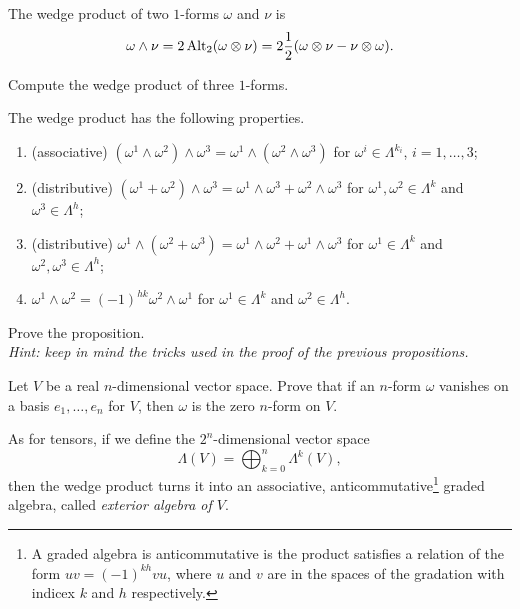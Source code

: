 \begin{example}
  The wedge product of two $1$-forms $\omega$ and $\nu$ is
  \begin{equation}
    \omega\wedge\nu = 2\operatorname{Alt}_2(\omega\otimes\nu) = 2 \frac12 (\omega \otimes \nu - \nu \otimes \omega).
  \end{equation}
\end{example}

\begin{exercise}
  Compute the wedge product of three $1$-forms.
\end{exercise}

\begin{proposition}
  The wedge product has the following properties.
  \begin{enumerate}
    \item (associative) $(\omega^1\wedge\omega^2)\wedge\omega^3 = \omega^1\wedge(\omega^2\wedge\omega^3)$ for $\omega^i\in\Lambda^{k_i}$, $i=1,\ldots, 3$;
    \item (distributive) $(\omega^1+\omega^2)\wedge\omega^3 = \omega^1\wedge\omega^3+\omega^2\wedge\omega^3$ for $\omega^1,\omega^2\in\Lambda^{k}$ and $\omega^3\in\Lambda^h$;
    \item (distributive) $\omega^1\wedge(\omega^2+\omega^3) = \omega^1\wedge\omega^2+\omega^1\wedge\omega^3$ for $\omega^1\in\Lambda^{k}$ and $\omega^2,\omega^3\in\Lambda^h$;
    \item $\omega^1\wedge\omega^2 = {(-1)}^{hk}\omega^2\wedge\omega^1$ for $\omega^1\in\Lambda^{k}$ and $\omega^2\in\Lambda^h$.
  \end{enumerate}
\end{proposition}
\begin{exercise}
  Prove the proposition.\\
  \textit{\small Hint: keep in mind the tricks used in the proof of the previous propositions.}
\end{exercise}

\begin{exercise}\label{ex:zeroform}
  Let $V$ be a real $n$-dimensional vector space.
  Prove that if an $n$-form $\omega$ vanishes on a basis $e_1,\ldots,e_n$ for $V$, then $\omega$ is the zero $n$-form on $V$.
\end{exercise}

\begin{remark}
  As for tensors, if we define the $2^n$-dimensional vector space
  \begin{equation}
    \Lambda(V) = \bigoplus_{k=0}^n \Lambda^k(V),
  \end{equation}
  then the wedge product turns it into an associative, anticommutative\footnote{A graded algebra is anticommutative is the product satisfies a relation of the form $uv = {(-1)}^{kh}vu$, where $u$ and $v$ are in the spaces of the gradation with indicex $k$ and $h$ respectively.} graded algebra, called \emph{exterior algebra of $V$}.
\end{remark}

